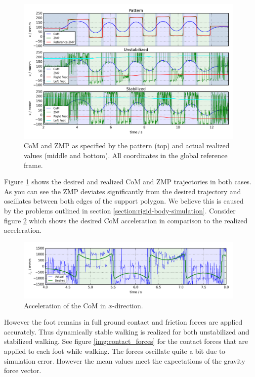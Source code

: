 \documentclass[english,ngerman]{KITreprt}
\begin{document}
\begin{figure}[H]
\vspace*{-1em}
\includegraphics[width=\textwidth,resolution=300]{images/undisturbed_straight_x.png}
\caption{CoM and ZMP as specified by the pattern (top) and actual realized values (middle and bottom).
All coordinates in the global reference frame.}
\label{img:undisturbed-straight-x}
\end{figure}

Figure \ref{img:undisturbed-straight-x} shows the desired and realized
CoM and ZMP trajectories in both cases. As you can see the ZMP deviates
significantly from the desired trajectory and oscillates between both
edges of the support polygon. We believe this is caused by the problems
outlined in section \ref{section:rigid-body-simulation}. Consider figure
\ref{img:noisy-com-acc} which shows the desired CoM acceleration in
comparison to the realized acceleration.

\begin{figure}[hbt]
\vspace*{-1em}
\includegraphics[width=\textwidth,resolution=300]{images/noisy_com_acc.png}
\caption{Acceleration of the CoM in $x$-direction.}
\label{img:noisy-com-acc}
\end{figure}

However the foot remains in full ground contact and friction forces are
applied accurately. Thus dynamically stable walking is realized for both
unstabilized and stabilized walking. See figure \ref{img:contact_forces}
for the contact forces that are applied to each foot while walking. The
forces oscillate quite a bit due to simulation error. However the mean
values meet the expectations of the gravity force vector.
\end{document}
